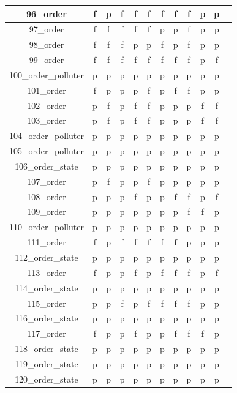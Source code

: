 \documentclass[
fancyheadings, %
%
%
]{stsreprt}
\begin{document}
\begin{longtable}{|c|c|c|c|c|c|c|c|c|c|c|c|}
96\_order & f & p & f & f & f & f & f & f & p & p \\
\hline
97\_order & f & f & f & f & f & p & p & f & p & p \\
\hline
98\_order & f & f & f & p & p & f & p & f & p & p \\
\hline
99\_order & f & f & f & f & f & f & f & f & p & f \\
\hline
100\_order\_polluter & p & p & p & p & p & p & p & p & p & p \\
\hline
101\_order & f & p & p & p & f & p & f & f & p & p \\
\hline
102\_order & p & f & p & f & f & p & p & p & f & f \\
\hline
103\_order & p & f & p & f & f & p & p & p & f & f \\
\hline
104\_order\_polluter & p & p & p & p & p & p & p & p & p & p \\
\hline
105\_order\_polluter & p & p & p & p & p & p & p & p & p & p \\
\hline
106\_order\_state & p & p & p & p & p & p & p & p & p & p \\
\hline
107\_order & p & f & p & p & f & p & p & p & p & p \\
\hline
108\_order & p & p & p & f & p & p & f & f & p & f \\
\hline
109\_order & p & p & p & p & p & p & p & f & f & p \\
\hline
110\_order\_polluter & p & p & p & p & p & p & p & p & p & p \\
\hline
111\_order & f & p & f & f & f & f & f & p & p & p \\
\hline
112\_order\_state & p & p & p & p & p & p & p & p & p & p \\
\hline
113\_order & f & p & p & f & p & f & f & f & p & f \\
\hline
114\_order\_state & p & p & p & p & p & p & p & p & p & p \\
\hline
115\_order & p & p & f & p & f & f & f & f & p & p \\
\hline
116\_order\_state & p & p & p & p & p & p & p & p & p & p \\
\hline
117\_order & f & p & p & f & p & p & f & f & f & p \\
\hline
118\_order\_state & p & p & p & p & p & p & p & p & p & p \\
\hline
119\_order\_state & p & p & p & p & p & p & p & p & p & p \\
\hline
120\_order\_state & p & p & p & p & p & p & p & p & p & p \\

\end{longtable}
\end{document}
